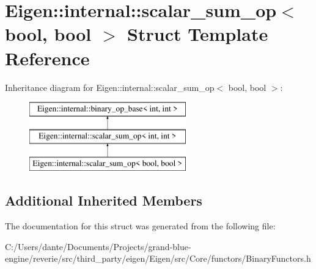 \hypertarget{struct_eigen_1_1internal_1_1scalar__sum__op_3_01bool_00_01bool_01_4}{}\section{Eigen\+::internal\+::scalar\+\_\+sum\+\_\+op$<$ bool, bool $>$ Struct Template Reference}
\label{struct_eigen_1_1internal_1_1scalar__sum__op_3_01bool_00_01bool_01_4}
Inheritance diagram for Eigen\+::internal\+::scalar\+\_\+sum\+\_\+op$<$ bool, bool $>$\+:\begin{figure}[H]
\begin{center}
\leavevmode
\includegraphics[height=3.000000cm]{struct_eigen_1_1internal_1_1scalar__sum__op_3_01bool_00_01bool_01_4}
\end{center}
\end{figure}
\subsection*{Additional Inherited Members}


The documentation for this struct was generated from the following file\+:\begin{DoxyCompactItemize}
\item 
C\+:/\+Users/dante/\+Documents/\+Projects/grand-\/blue-\/engine/reverie/src/third\+\_\+party/eigen/\+Eigen/src/\+Core/functors/Binary\+Functors.\+h\end{DoxyCompactItemize}
